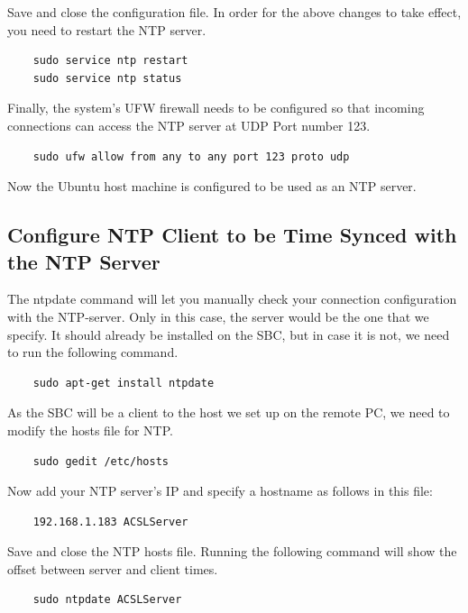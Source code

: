 \documentclass[12]{article}
\begin{document}
Save and close the configuration file. In order for the above changes to take effect, you need to restart the NTP server. 


\begin{lstlisting}
    sudo service ntp restart
    sudo service ntp status
\end{lstlisting}

Finally, the system’s UFW firewall needs to be configured so that incoming connections can access the NTP server at UDP Port number 123.


\begin{lstlisting}
    sudo ufw allow from any to any port 123 proto udp
\end{lstlisting}

Now the Ubuntu host machine is configured to be used as an NTP server.

\subsection{Configure NTP Client to be Time Synced with the NTP Server}

The ntpdate command will let you manually check your connection configuration with the NTP-server. Only in this case, the server would be the one that we specify. It should already be installed on the SBC, but in case it is not, we need to run the following command.

\begin{lstlisting}
    sudo apt-get install ntpdate
\end{lstlisting}

As the SBC will be a client to the host we set up on the remote PC, we need to modify the hosts file for NTP.

\begin{lstlisting}
    sudo gedit /etc/hosts
\end{lstlisting}

Now add your NTP server’s IP and specify a hostname as follows in this file:

\begin{lstlisting}
    192.168.1.183 ACSLServer
\end{lstlisting}

Save and close the NTP hosts file. Running the following command will show the offset between server and client times.

\begin{lstlisting}
    sudo ntpdate ACSLServer
\end{lstlisting}
\end{document}
